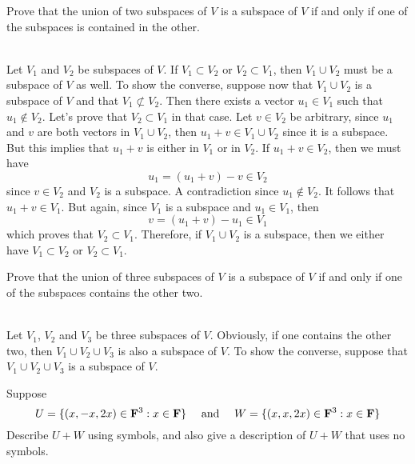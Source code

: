\begin{exercise}
    Prove that the union of two subspaces of $V$ is a subspace of $V$ if and only if one of the subspaces is contained in the other. \\
\end{exercise}

\begin{solution}
    \\ Let $V_1$ and $V_2$ be subspaces of $V$. If $V_1 \subset V_2$ or $V_2 \subset V_1$, then $V_1 \cup V_2$ must be a subspace of $V$ as well. To show the converse, suppose now that $V_1 \cup V_2$ is a subspace of $V$ and that $V_1 \not\subset V_2$. Then there exists a vector $u_1 \in V_1$ such that $u_1 \notin V_2$. Let's prove that $V_2 \subset V_1$ in that case. Let $v \in V_2$ be arbitrary, since $u_1$ and $v$ are both vectors in $V_1 \cup V_2$, then $u_1 + v \in V_1 \cup V_2$ since it is a subspace. But this implies that $u_1 + v$ is either in $V_1$ or in $V_2$. If $u_1 + v \in V_2$, then we must have
    $$u_1 = (u_1 + v) - v \in V_2$$
    since $v \in V_2$ and $V_2$ is a subspace. A contradiction since $u_1 \notin V_2$. It follows that $u_1 + v \in V_1$. But again, since $V_1$ is a subspace and $u_1 \in V_1$, then
    $$v = (u_1 + v) - u_1 \in V_1$$
    which proves that $V_2 \subset V_1$. Therefore, if $V_1 \cup V_2$ is a subspace, then we either have $V_1 \subset V_2$ or $V_2 \subset V_1$. \\
\end{solution}

\begin{exercise}
    Prove that the union of three subspaces of $V$ is a subspace of $V$ if and only if one of the subspaces contains the other two. \\
\end{exercise}

\begin{solution}
    \\ Let $V_1$, $V_2$ and $V_3$ be three subspaces of $V$. Obviously, if one contains the other two, then $V_1 \cup V_2 \cup V_3$ is also a subspace of $V$. To show the converse, suppose that $V_1 \cup V_2 \cup V_3$ is a subspace of $V$. \td \\
\end{solution}

\begin{exercise}
    Suppose
    $$U = \{(x, -x, 2x) \in \mathbf{F}^3:x \in \mathbf{F}\} \quad \text{ and } \quad W = \{(x, x, 2x) \in \mathbf{F}^3:x \in \mathbf{F}\} $$
    Describe $U+W$ using symbols, and also give a description of $U + W$ that uses no symbols. \\
\end{exercise}

